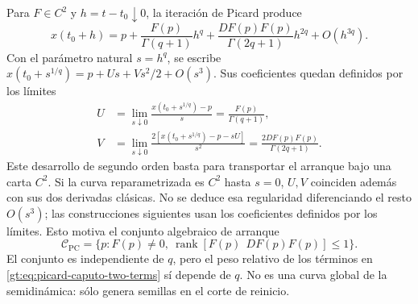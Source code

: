 Para $F\in C^2$ y $h=t-t_0\downarrow0$, la iteración de Picard produce
\begin{equation}
 x(t_0+h)=p+
 \frac{F(p)}{\Gamma(q+1)}h^q+
 \frac{DF(p)F(p)}{\Gamma(2q+1)}h^{2q}
 +O(h^{3q}).
 \label{gt:eq:picard-caputo-two-terms}
\end{equation}
Con el parámetro natural $s=h^q$, se escribe
$x(t_0+s^{1/q})=p+Us+Vs^2/2+O(s^3)$. Sus coeficientes quedan
definidos por los límites
\begin{equation}
 \begin{aligned}
 U&=\lim_{s\downarrow0}\frac{x(t_0+s^{1/q})-p}{s}
   =\frac{F(p)}{\Gamma(q+1)},\\
 V&=\lim_{s\downarrow0}
 \frac{2[x(t_0+s^{1/q})-p-sU]}{s^2}
   =\frac{2DF(p)F(p)}{\Gamma(2q+1)}.
 \end{aligned}
 \label{gt:eq:picard-s-derivatives}
\end{equation}
Este desarrollo de segundo orden basta para transportar el arranque bajo
una carta $C^2$. Si la curva reparametrizada es $C^2$ hasta $s=0$,
$U,V$ coinciden además con sus dos derivadas clásicas. No se deduce esa
regularidad diferenciando el resto $O(s^3)$; las construcciones siguientes
usan los coeficientes definidos por los límites.
Esto motiva el conjunto algebraico de arranque
\begin{equation}
 \mathcal C_{\mathrm{PC}}
 =\{p:F(p)\ne0,\
 \operatorname{rank}[F(p)\ \ DF(p)F(p)]\le1\}.
 \label{gt:eq:picard-caputo-connecting}
\end{equation}
El conjunto es independiente de $q$, pero el peso relativo de los términos en
\eqref{gt:eq:picard-caputo-two-terms} sí depende de $q$. No es una curva
global de la semidinámica: sólo genera semillas en el corte de reinicio.

